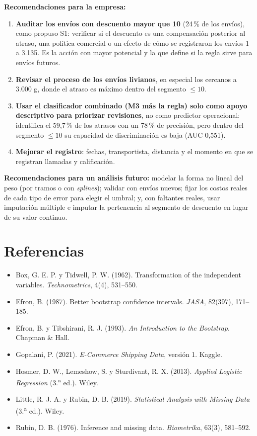 \documentclass[11pt,a4paper]{article}
\begin{document}
\textbf{Recomendaciones para la empresa:}
\begin{enumerate}[leftmargin=*,itemsep=0pt,topsep=1pt]
\item \textbf{Auditar los envíos con descuento mayor que 10} (24\,\% de los envíos), como propuso S1: verificar si el descuento es una compensación posterior al atraso, una política comercial o un efecto de cómo se registraron los envíos 1 a 3.135. Es la acción con mayor potencial y la que define si la regla sirve para envíos futuros.
\item \textbf{Revisar el proceso de los envíos livianos}, en especial los cercanos a 3.000 g, donde el atraso es máximo dentro del segmento $\le 10$.
\item \textbf{Usar el clasificador combinado (M3 más la regla) solo como apoyo descriptivo para priorizar revisiones}, no como predictor operacional: identifica el 59,7\,\% de los atrasos con un 78\,\% de precisión, pero dentro del segmento $\le 10$ su capacidad de discriminación es baja (AUC 0,551).
\item \textbf{Mejorar el registro}: fechas, transportista, distancia y el momento en que se registran llamadas y calificación.
\end{enumerate}

\textbf{Recomendaciones para un análisis futuro:} modelar la forma no lineal del peso (por tramos o con \emph{splines}); validar con envíos nuevos; fijar los costos reales de cada tipo de error para elegir el umbral; y, con faltantes reales, usar imputación múltiple e imputar la pertenencia al segmento de descuento en lugar de su valor continuo.

\section*{Referencias}
\begin{footnotesize}
\begin{itemize}[itemsep=0pt,topsep=2pt]
\item Box, G. E. P. y Tidwell, P. W. (1962). Transformation of the independent variables. \emph{Technometrics}, 4(4), 531--550.
\item Efron, B. (1987). Better bootstrap confidence intervals. \emph{JASA}, 82(397), 171--185.
\item Efron, B. y Tibshirani, R. J. (1993). \emph{An Introduction to the Bootstrap}. Chapman \& Hall.
\item Gopalani, P. (2021). \emph{E-Commerce Shipping Data}, versión 1. Kaggle.
\item Hosmer, D. W., Lemeshow, S. y Sturdivant, R. X. (2013). \emph{Applied Logistic Regression} (3.\textsuperscript{a} ed.). Wiley.
\item Little, R. J. A. y Rubin, D. B. (2019). \emph{Statistical Analysis with Missing Data} (3.\textsuperscript{a} ed.). Wiley.
\item Rubin, D. B. (1976). Inference and missing data. \emph{Biometrika}, 63(3), 581--592.
\end{itemize}
\end{footnotesize}
\end{document}
